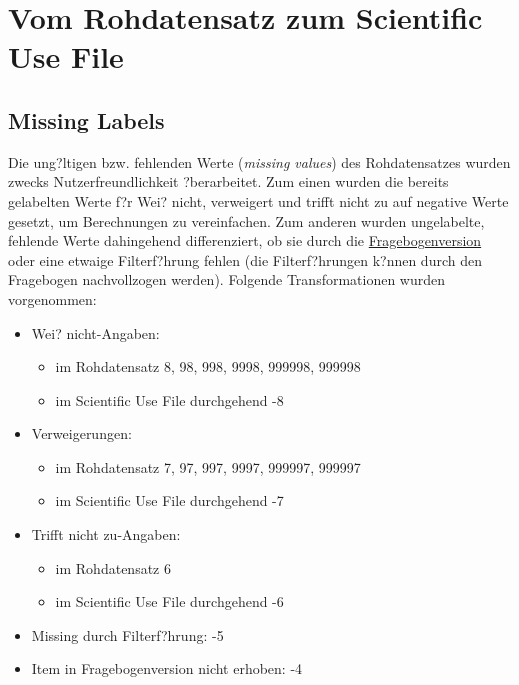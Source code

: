 \section{Vom Rohdatensatz zum Scientific Use File}



\subsection{Missing Labels}\label{var_miss}

Die \glqq ung?ltigen\grqq\xspace bzw. fehlenden Werte (\textit{missing values}) des Rohdatensatzes wurden zwecks Nutzerfreundlichkeit ?berarbeitet. Zum einen wurden die bereits gelabelten Werte f?r \glqq Wei? nicht\grqq , \glqq verweigert\grqq\xspace und \glqq trifft nicht zu\grqq\xspace auf negative Werte gesetzt, um Berechnungen zu vereinfachen. Zum anderen wurden ungelabelte, fehlende Werte dahingehend differenziert, ob sie durch die \hyperref[langkurz]{Fragebogenversion} oder eine etwaige Filterf?hrung fehlen (die Filterf?hrungen k?nnen durch den Fragebogen nachvollzogen werden). Folgende Transformationen wurden vorgenommen:

\begin{itemize}
	\item \glqq Wei? nicht\grqq -Angaben:
	\begin{itemize}
	\item im Rohdatensatz 8, 98, 998, 9998, 999998, 999998 
	\item im Scientific Use File durchgehend -8
	\end{itemize}
	\item Verweigerungen:
	\begin{itemize}
	\item im Rohdatensatz 7, 97, 997, 9997, 999997, 999997 
	\item im Scientific Use File durchgehend -7
	\end{itemize}
	\item \glqq Trifft nicht zu\grqq -Angaben:
	\begin{itemize}
	\item im Rohdatensatz 6
	\item im Scientific Use File durchgehend -6
	\end{itemize}
	\item \glqq Missing durch Filterf?hrung\grqq : -5
	\item \glqq Item in Fragebogenversion nicht erhoben\grqq : -4

\end{itemize}

